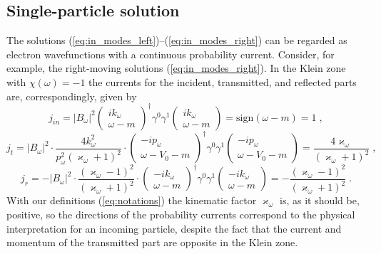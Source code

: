 \documentclass[12pt]{article}
\newcommand\beq{\begin{equation}}
\newcommand\eeq{\end{equation}}
\def\kw{k_{\omega}} \def\pw{p_{\omega}}
\def\kappaw{\varkappa_{\omega}}
\def\w{\omega}
\def\sign{\text{sign}}
\numberwithin{equation}{section}
\begin{document}
\begin{appendices}
\section{Single-particle solution}\label{app:1_particle_solution}
The solutions (\ref{eq:in_modes_left})–(\ref{eq:in_modes_right}) can be regarded as electron wavefunctions with a continuous probability current. Consider, for example, the right-moving solutions (\ref{eq:in_modes_right}). In the Klein zone with $\chi(\w)=-1$ the currents for the incident, transmitted, and reflected parts are, correspondingly, given by
\beq
    j_{in} = \left|B_{\w}\right|^2 
    \begin{pmatrix}
        i\kw\\
        \omega -m
    \end{pmatrix}^{\dagger} \gamma^0\gamma^1\begin{pmatrix}
        i\kw\\
        \omega -m
    \end{pmatrix} = \sign\left(\w-m\right)=1\;,
\eeq
\beq
    j_{t} = \left|B_{\w}\right|^2 \cdot\frac{4\kw^2}{\pw^2\left(\kappaw+1\right)^2}\cdot
    \begin{pmatrix}
        -i\pw\\
        \omega -V_0-m
    \end{pmatrix}^{\dagger} \gamma^0\gamma^1\begin{pmatrix}
        -i\pw\\
        \omega -V_0-m
    \end{pmatrix} = \frac{4\kappaw}{\left(\kappaw+1\right)^2}\;,
\eeq
\beq
    j_{r} = -\left|B_{\w}\right|^2 \cdot\frac{\left(\kappaw-1\right)^2}{\left(\kappaw+1\right)^2}\cdot
    \begin{pmatrix}
        -i\kw\\
        \omega -m
    \end{pmatrix}^{\dagger} \gamma^0\gamma^1\begin{pmatrix}
        -i\kw\\
        \omega -m
    \end{pmatrix} = -\frac{\left(\kappaw-1\right)^2}{\left(\kappaw+1\right)^2}\;.
\eeq
With our definitions (\ref{eq:notations}) the kinematic factor $\kappaw$ is, as it should be, positive, so the directions of the probability currents correspond to the physical interpretation for an incoming particle, despite the fact that the current and momentum of the transmitted part are opposite in the Klein zone.


\end{appendices}
\end{document}
